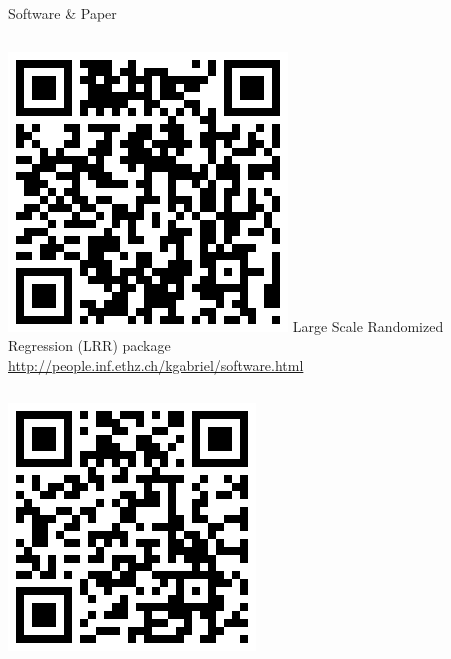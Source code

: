 \documentclass[final,t,english,professionalfonts, xcolor=dvipsnames]{beamer}
\begin{document}
\begin{frame}{}
{\begin{minipage}[c]{0.96\linewidth}
\begin{columns}[t]
\begin{column}{.33\linewidth}
\begin{alertblock}{Software \& Paper}
\vskip-0.5cm
\begin{columns}[c]
\includegraphics[width=\textwidth]{qr-software.png}
Large Scale Randomized Regression (LRR) package\\
\url{http://people.inf.ethz.ch/kgabriel/software.html}
\end{columns}
\vskip0.5cm
\begin{columns}[c]
\includegraphics[width=\textwidth]{qr-paper.png}

\end{columns}
\end{alertblock}
\end{column}
\end{columns}
\end{minipage}}
\end{frame}
\end{document}
